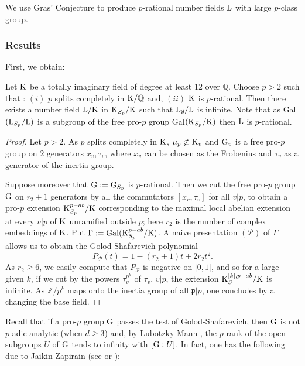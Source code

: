 \documentclass[12pt,a4paper,twoside,english]{smfart}
\def\Q{{\mathbb Q}}
\def\Z{{\mathbb Z}}
\def\p{{\mathfrak p}}
\def\G{{\rm G}}
\def\K{{\rm K}}
\def\L{{\rm L}}
\def\PP{{\mathcal P}}
\def\Gal{{\rm Gal}}
\begin{document}
 
\smallskip

We use Gras' Conjecture to  produce  $p$-rational number fields $\L$ with large $p$-class group. 
  
\subsubsection{Results}  
  
  First, we obtain:

\begin{theo} \label{theo:unramified-prational}
Let $\K$  be a totally imaginary field of degree at least $12$ over $\Q$. Choose $p>2$ such that : $(i)$ $p$ splits completely in $\K/\Q$ and, $(ii)$ $\K$ is $p$-rational.
Then there exists a number field $\L/\K$ in $\K_{S_p}/\K$ such that $\L_\emptyset/\L$ is infinite.
Note that as Gal$(\L_{S_p}/\L)$ is a subgroup of the free pro-$p$ group Gal$(\K_{S_p}/\K)$ then $\L$ is $p$-rational.
\end{theo} 

 
 
 \begin{proof} 
 Let $p>2$. As $p$ splits completely in $\K$,
$\mu_p \not \subset \K_v$  and $\G_v$ is a free pro-$p$ group on $2$ generators $x_v,\tau_v$, where $x_v$ can be chosen as  the Frobenius and  $\tau_v$ as a generator of the  inertia group.

Suppose moreover that $\G:=\G_{S_p}$ is $p$-rational.
Then we cut the free pro-$p$ group $\G$ on $r_2+1$ generators by all the commutators $[x_v,\tau_v]$ for all $v|p$, to obtain a pro-$p$ extension $\K_{S_p}^{p-ab}/\K$ corresponding to the maximal local abelian extension at every $v|p$ of $\K$ unramified outside $p$;  here $r_2$ is the number of complex embeddings of $\K$. 
Put $\Gamma:=\Gal(\K_{S_p}^{p-ab}/\K)$. A naive presentation $(\PP)$ of $\Gamma$ allows us to obtain the Golod-Shafarevich
 polynomial   $$P_\PP(t)=1-(r_2+1)t+2r_2t^2.$$
As $r_2 \geq 6$, we easily compute  that $P_\PP$ is negative on $]0,1[$,  and so  for a large given $k$, if we  cut by the powers 
$\tau_v^{p^k}$ of $\tau_v$, $v|p$, the extension  $\K_S^{{[k],p-ab}}/\K$ is infinite. As $\Z/p^k$ maps onto the inertia group of all $\p|p$, one concludes by a changing the base field.
\end{proof}

 
 
 
Recall that if a pro-$p$ group $\G$ passes the test of Golod-Shafarevich, then $\G$ is not $p$-adic analytic (when $d\geq 3$) and,  by Lubotzky-Mann \cite{Lubotzky-Mann}, the $p$-rank of the open subgroups $U$ of $\G$ tends to infinity with $[ \G:U]$. 
 In fact, one has the following due to Jaikin-Zapirain (see \cite{Jaikin} or \cite[Theorem 8.3]{Ershov}):
 
\end{document}
